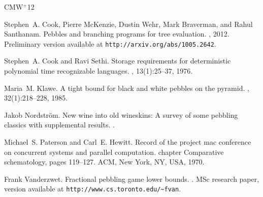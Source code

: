 \documentclass[oribib1]{llncs}
\begin{document}
\newcommand{\etalchar}[1]{$^{#1}$}
\def\bibRCS{$Id: theory.bib,v 1.386 2001/10/08 23:03:17 beame Exp $}
  \makeatletter {}  \makeatother
\begin{thebibliography}{CMW{\etalchar{+}}12}

\bibitem[CMW{\etalchar{+}}12]{c:pebjournal}
Stephen~A. Cook, Pierre McKenzie, Dustin Wehr, Mark Braverman, and Rahul
  Santhanam.
\newblock Pebbles and branching programs for tree evaluation.
, 2012.
\newblock Preliminary version available at
  \verb+http://arxiv.org/abs/1005.2642+.

Stephen~A. Cook and Ravi Sethi.
\newblock Storage requirements for deterministic polynomial time recognizable
  languages.
, 13(1):25--37, 1976.

Maria~M. Klawe.
\newblock A tight bound for black and white pebbles on the pyramid.
, 32(1):218--228, 1985.

Jakob Nordstr{\"o}m.
\newblock New wine into old wineskins: A survey of some pebbling classics with
  supplemental results.
.

Michael~S. Paterson and Carl~E. Hewitt.
\newblock Record of the project mac conference on concurrent systems and
  parallel computation.
\newblock chapter Comparative schematology, pages 119--127. ACM, New York, NY,
  USA, 1970.

Frank Vanderzwet.
\newblock Fractional pebbling game lower bounds.
.
\newblock MSc research paper, version available at
  \verb+http://www.cs.toronto.edu/~fvan+.

\end{thebibliography}
\end{document}
